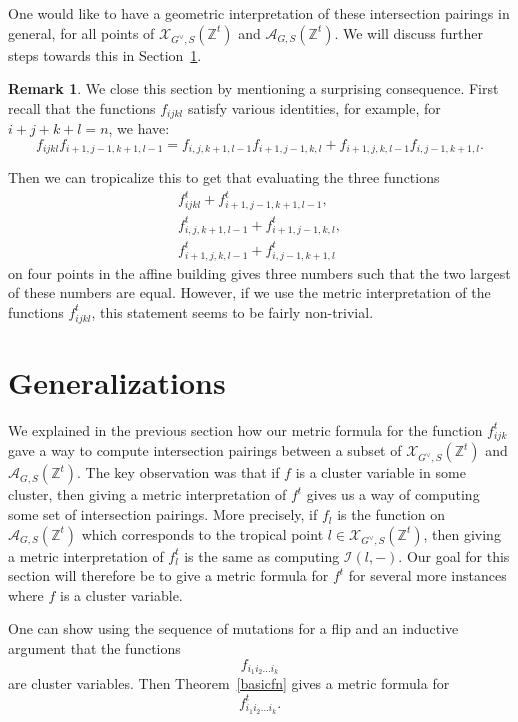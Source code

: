 \documentclass[10pt]{amsart}
\theoremstyle{definition}
\newtheorem{rema}[theorem]{Remark}
\newcommand{\Zt}{\mathbb{Z}^t}
\newcommand{\A}{\mathcal{A}}
\newcommand{\X}{\mathcal{X}}
\newcommand{\I}{\mathcal{I}}
\newcommand{\vG}{G^\vee}
\begin{document}
One would like to have a geometric interpretation of these intersection pairings in general, for all points of $\X_{\vG,S}(\Zt)$ and $\A_{G,S}(\Zt)$. We will discuss further steps towards this in Section~\ref{sect6}.

\begin{rema} We close this section by mentioning a surprising consequence. First recall that the functions $f_{ijkl}$ satisfy various identities, for example, for $i+j+k+l=n$, we have:
\[
f_{ijkl} f_{i+1, j-1, k+1, l-1} = f_{i, j, k+1, l-1} f_{i+1, j-1, k, l} + f_{i+1, j, k, l-1} f_{i, j-1, k+1, l}.
\]

Then we can tropicalize this to get that evaluating the three functions
\begin{gather*}
f^t_{ijkl} + f^t_{i+1, j-1, k+1, l-1},
\\
f^t_{i, j, k+1, l-1} + f^t_{i+1, j-1, k, l},
\\
f^t_{i+1, j, k, l-1} + f^t_{i, j-1, k+1, l}
\end{gather*}
on four points in the affine building gives three numbers such that the two largest of these numbers are equal. However, if we use the metric interpretation of the functions $f^t_{ijkl}$, this statement seems to be fairly non-trivial.
\end{rema}

\section{Generalizations}\label{sect6}

We explained in the previous section how our metric formula for the function $f_{ijk}^t$ gave a way to compute intersection pairings between a subset of $\X_{\vG,S}(\Zt)$ and $\A_{G,S}(\Zt)$. The key observation was that if $f$ is a cluster variable in some cluster, then giving a metric interpretation of $f^t$ gives us a way of computing some set of intersection pairings. More precisely, if $f_l$ is the function on $\A_{G,S}(\Zt)$ which corresponds to the tropical point $l \in \X_{\vG,S}(\Zt)$, then giving a metric interpretation of $f_l^t$ is the same as computing $\I(l, -)$. Our goal for this section will therefore be to give a metric formula for $f^t$ for several more instances where $f$ is a cluster variable.

One can show using the sequence of mutations for a flip and an inductive argument that the functions 
\[
f_{i_1i_2\dots i_k}
\]
are cluster variables. Then Theorem~\ref{basicfn} gives a metric formula for 
\[
f_{i_1i_2\dots i_k}^t.
\]
\end{document}

